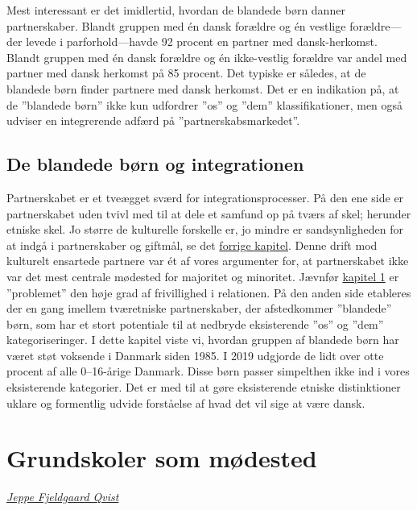 \documentclass[
]{book}
\begin{document}
Mest interessant er det imidlertid, hvordan de blandede børn danner partnerskaber. Blandt gruppen med én dansk forældre og én vestlige forældre---der levede i parforhold---havde 92 procent en partner med dansk-herkomst. Blandt gruppen med én dansk forældre og én ikke-vestlig forældre var andel med partner med dansk herkomst på 85 procent. Det typiske er således, at de blandede børn finder partnere med dansk herkomst. Det er en indikation på, at de ''blandede børn'' ikke kun udfordrer ''os'' og ''dem'' klassifikationer, men også udviser en integrerende adfærd på ''partnerskabsmarkedet''.

\section{De blandede børn og integrationen}\label{de-blandede-buxf8rn-og-integrationen}

Partnerskabet er et tveægget sværd for integrationsprocesser. På den ene side er partnerskabet uden tvivl med til at dele et samfund op på tværs af skel; herunder etniske skel. Jo større de kulturelle forskelle er, jo mindre er sandsynligheden for at indgå i partnerskaber og giftmål, se det \hyperref[kap1]{forrige kapitel}. Denne drift mod kulturelt ensartede partnere var ét af vores argumenter for, at partnerskabet ikke var det mest centrale mødested for majoritet og minoritet. Jævnfør \hyperref[kap1]{kapitel 1} er ''problemet'' den høje grad af frivillighed i relationen. På den anden side etableres der en gang imellem tværetniske partnerskaber, der afstedkommer ''blandede'' børn, som har et stort potentiale til at nedbryde eksisterende ''os'' og ''dem'' kategoriseringer. I dette kapitel viste vi, hvordan gruppen af blandede børn har været støt voksende i Danmark siden 1985. I 2019 udgjorde de lidt over otte procent af alle 0--16-årige Danmark. Disse børn passer simpelthen ikke ind i vores eksisterende kategorier. Det er med til at gøre eksisterende etniske distinktioner uklare og formentlig udvide forståelse af hvad det vil sige at være dansk.

\chapter{Grundskoler som mødested}\label{kap4}

\thispagestyle{empty}

\emph{\href{https://vbn.aau.dk/da/persons/jeppefl}{Jeppe Fjeldgaard Qvist}}

~~~~
\end{document}
